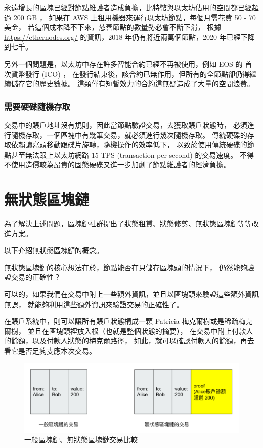 永遠增長的區塊已經對節點維護者造成負擔，比特幣與以太坊佔用的空間都已經超過 200 GB ，
如果在 AWS 上租用機器來運行以太坊節點，每個月需花費 50 - 70 美金，
若這個成本降不下來，慈善節點的數量勢必會不斷下滑，
根據 \url{https://ethernodes.org/} 的資訊，2018 年仍有將近兩萬個節點，2020 年已經下降到七千。

另外一個問題是，以太坊中存在許多智能合約已經不再被使用，例如 EOS 的 首次貨幣發行 (ICO) ，
在發行結束後，該合約已無作用，但所有的全節點卻仍得繼續儲存它的歷史數據。
這類僅有短暫效力的合約這無疑造成了大量的空間浪費。

\subsubsection{需要硬碟隨機存取}
交易中的賬戶地址沒有規則，因此當節點驗證交易，去獲取賬戶狀態時，
必須進行隨機存取，一個區塊中有幾筆交易，就必須進行幾次隨機存取。
傳統硬碟的存取依賴讀寫頭移動跟碟片旋轉，隨機操作的效率低下，
以致於使用傳統硬碟的節點甚至無法跟上以太坊網路 15 TPS (transaction per second) 的交易速度。
不得不使用造價較為昂貴的固態硬碟又進一步加劇了節點維護者的經濟負擔。

\section{無狀態區塊鏈}
為了解決上述問題，區塊鏈社群提出了狀態租賃、狀態修剪、無狀態區塊鏈等等改進方案。

以下介紹無狀態區塊鏈的概念。

無狀態區塊鏈的核心想法在於，節點能否在只儲存區塊頭的情況下，
仍然能夠驗證交易的正確性？

可以的，如果我們在交易中附上一些額外資訊，並且以區塊頭來驗證這些額外資訊無誤，
就能夠利用這些額外資訊來驗證交易的正確性了。

在賬戶系統中，則可以讓所有賬戶狀態構成一顆 Patricia 梅克爾樹或是稀疏梅克爾樹\cite{dahlberg2016efficient}，
並且在區塊頭裡放入根（也就是整個狀態的摘要），
在交易中附上付款人的餘額，以及付款人狀態的梅克爾路徑，
如此，就可以確認付款人的餘額，再去看它是否足夠支應本次交易。

\begin{figure}
\includegraphics[width=\textwidth]{stateless-tx}
\caption{一般區塊鏈、無狀態區塊鏈交易比較}
\end{figure}

